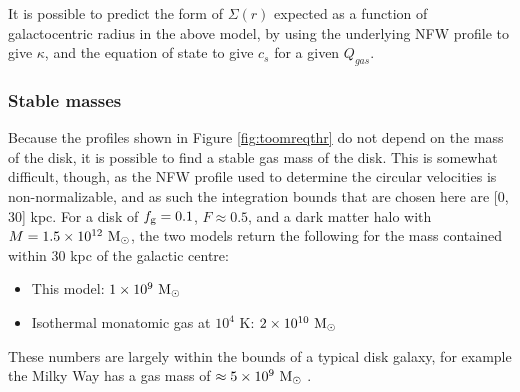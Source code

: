 It is possible to predict the form of $\Sigma(r)$ expected as a function of galactocentric radius in the above model, by using the underlying NFW profile to give $\kappa$, and the equation of state to give $c_s$ for a given $Q_{gas}$.

\subsubsection{Stable masses}

Because the profiles shown in Figure \ref{fig:toomreqthr} do not depend on the mass of the disk, it is possible to find a stable gas mass of the disk.
This is somewhat difficult, though, as the NFW profile used to determine the circular velocities is non-normalizable, and as such the integration bounds that are chosen here are [0, 30] kpc.
For a disk of $f_\mathrm{g}=0.1$, $F \approx 0.5$, and a dark matter halo with $M = 1.5\times10^{12} ~\mathrm{M}_{\odot}$, the two models return the following for the mass contained within 30 kpc of the galactic centre:
\begin{itemize}
    \item This model: $1 \times 10^9 ~\mathrm{M}_{\odot}$
    \item Isothermal monatomic gas at $10^4$ K: $2 \times 10^{10}~\mathrm{M}_{\odot}$
\end{itemize}
These numbers are largely within the bounds of a typical disk galaxy, for example the Milky Way has a gas mass of $\approx 5\times10^9 ~\mathrm{M}_{\odot}$ \citep{licquia_improved_2013}.
